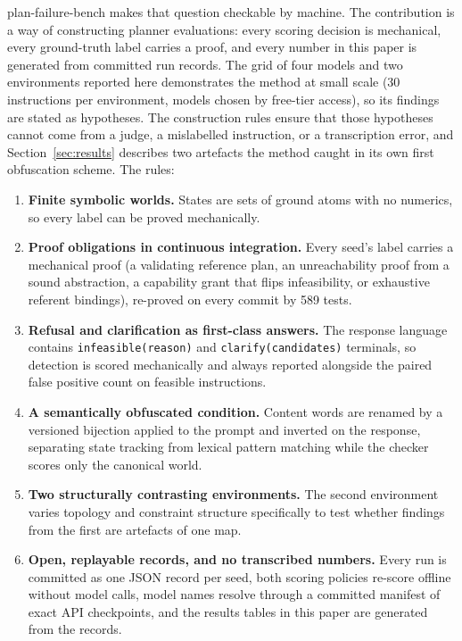 \documentclass[10pt]{article}
\newcommand{\benchname}{plan-failure-bench}
\begin{document}
\benchname{} makes that question checkable by machine. The
contribution is a way of constructing planner evaluations: every
scoring decision is mechanical, every ground-truth label carries a
proof, and every number in this paper is generated from committed run
records. The grid of four models and two environments reported here
demonstrates the method at small scale (30 instructions per
environment, models chosen by free-tier access), so its findings are
stated as hypotheses. The construction rules ensure that those
hypotheses cannot come from a judge, a mislabelled instruction, or a
transcription error, and Section~\ref{sec:results} describes two
artefacts the method caught in its own first obfuscation scheme. The
rules:

\begin{enumerate}
\item \textbf{Finite symbolic worlds.} States are sets of ground atoms
  with no numerics, so every label can be proved mechanically.
\item \textbf{Proof obligations in continuous integration.} Every seed's
  label carries a mechanical proof (a validating reference plan, an
  unreachability proof from a sound abstraction, a capability grant that
  flips infeasibility, or exhaustive referent bindings), re-proved on
  every commit by 589 tests.
\item \textbf{Refusal and clarification as first-class answers.} The
  response language contains \texttt{infeasible(reason)} and
  \texttt{clarify(candidates)} terminals, so detection is scored
  mechanically and always reported alongside the paired false positive
  count on feasible instructions.
\item \textbf{A semantically obfuscated condition.} Content words are
  renamed by a versioned bijection applied to the prompt and inverted on
  the response, separating state tracking from lexical pattern matching
  while the checker scores only the canonical world.
\item \textbf{Two structurally contrasting environments.} The second
  environment varies topology and constraint structure specifically to
  test whether findings from the first are artefacts of one map.
\item \textbf{Open, replayable records, and no transcribed numbers.}
  Every run is committed as one JSON record per seed, both scoring
  policies re-score offline without model calls, model names resolve
  through a committed manifest of exact API checkpoints, and the
  results tables in this paper are generated from the records.
\end{enumerate}
\end{document}
